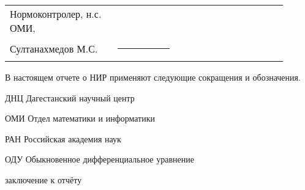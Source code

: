 \documentclass[utf8,usehyperref,12pt]{G7-32}
\begin{document}

\frontmatter %

\NirTitle{%





} %


\Executors %
\begin{longtable}{p{0.35\linewidth}p{0.2\linewidth}p{0.35\linewidth}}


Нормоконтролер, н.с. ОМИ,  &		&	\\
Султанахмедов М.С. & \rule{1\linewidth}{0.1pt}& \\
\end{longtable}



\setcounter{tocdepth}{2} %

\tableofcontents



\Abbreviations %
В настоящем отчете о НИР применяют следующие сокращения и обозначения.
\begin{abbreviation}
\item[ДНЦ] Дагестанский научный центр
\item[ОМИ] Отдел математики и информатики
\item[РАН] Российская академия наук
\item[ОДУ] Обыкновенное дифференциальное уравнение
\end{abbreviation}




\mainmatter %







\backmatter %

 заключение к отчёту



\end{document}
